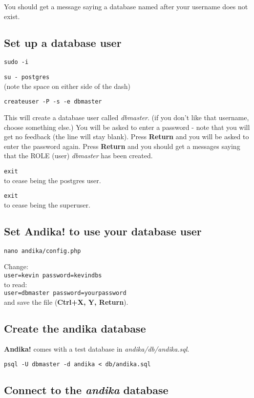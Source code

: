 \documentclass[a4paper,10pt]{article}
\begin{document}
You should get a message saying a database named after your username does not exist.

\subsection{Set up a database user}
\label{ss:dbuser}

\verb|sudo -i|

\verb|su - postgres|\\
(note the space on either side of the dash)

\verb|createuser -P -s -e dbmaster|

This will create a database user called \textit{dbmaster}.  (if you don't like that username, choose something else.) You will be asked to enter a password - note that you will get no feedback (the line will stay blank).  Press \textbf{Return} and you will be asked to enter the password again.  Press \textbf{Return} and you should get a messages saying that the ROLE (user) \textit{dbmaster} has been created.

\verb|exit|\\
to cease being the postgres user.

\verb|exit|\\
to cease being the superuser.

\subsection{Set Andika! to use your database user}

\verb|nano andika/config.php|

Change:\\
\verb|user=kevin password=kevindbs|\\
to read:\\
\verb|user=dbmaster password=yourpassword|\\
and save the file (\textbf{Ctrl+X, Y, Return}).

\subsection{Create the andika database}

\textbf{Andika!} comes with a test database in \textit{andika/db/andika.sql}.

\verb|psql -U dbmaster -d andika < db/andika.sql|

\subsection{Connect to the \textit{andika} database}
\label{ss:connect}
\end{document}
